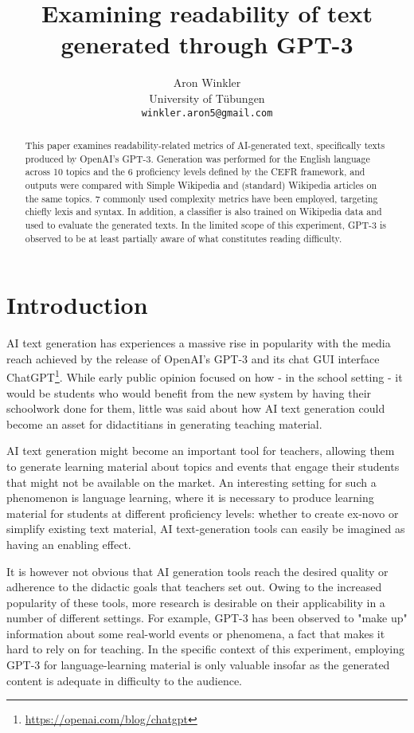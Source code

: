 \documentclass[11pt]{article}
\title{Examining readability of text generated through GPT-3 }
\author{Aron Winkler \\
  University of Tübungen \\
  \texttt{winkler.aron5@gmail.com}}
\begin{document}
\maketitle
\begin{abstract}
    This paper examines readability-related metrics of AI-generated text, specifically texts produced by OpenAI's GPT-3. Generation was performed for the English language across 10 topics and the 6 proficiency levels defined by the CEFR framework, and outputs were compared with Simple Wikipedia and (standard) Wikipedia articles on the same topics. 7 commonly used complexity metrics have been employed, targeting chiefly lexis and syntax. In addition, a classifier is also trained on Wikipedia data and used to evaluate the generated texts. In the limited scope of this experiment, GPT-3 is observed to be at least partially aware of what constitutes reading difficulty.
\end{abstract}

\section{Introduction}

AI text generation has experiences a massive rise in popularity with the media reach achieved by the release of OpenAI's GPT-3 \citep{brown2020language} and its chat GUI interface ChatGPT\footnote{\url{https://openai.com/blog/chatgpt}}. While early public opinion focused on how - in the school setting - it would be students who would benefit from the new system by having their schoolwork done for them, little was said about how AI text generation could become an asset for didactitians in generating teaching material.

AI text generation might become an important tool for teachers, allowing them to generate learning material about topics and events that engage their students that might not be available on the market. An interesting setting for such a phenomenon is language learning, where it is necessary to produce learning material for students at different proficiency levels: whether to create ex-novo or simplify existing text material, AI text-generation tools can easily be imagined as having an enabling effect. 

It is however not obvious that AI generation tools reach the desired quality or adherence to the didactic goals that teachers set out. Owing to the increased popularity of these tools, more research is desirable on their applicability in a number of different settings. For example, GPT-3 has been observed to "make up" information about some real-world events or phenomena, a fact that makes it hard to rely on for teaching. In the specific context of this experiment, employing GPT-3 for language-learning material is only valuable insofar as the generated content is adequate in difficulty to the audience.
\end{document}

